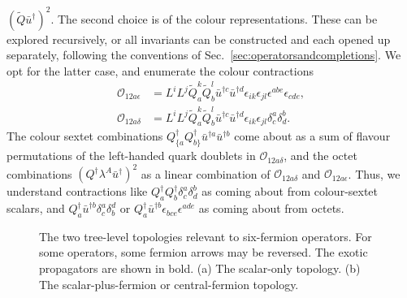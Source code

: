 $(\tilde{Q}\bar{u}^{\dagger})^{2}$. The second choice is of the colour
representations. These can be explored recursively, or all invariants can be
constructed and each opened up separately, following the conventions of
Sec.~\ref{sec:operatorsandcompletions}. We opt for the latter case, and
enumerate the colour contractions
\begin{subequations}
  \begin{align}
    \mathcal{O}_{12a\epsilon} &= L^{i} L^{j} \tilde{Q}^{k}_{a} \tilde{Q}^{l}_{b} \bar{u}^{\dagger c} \bar{u}^{\dagger d} \epsilon_{ik}\epsilon_{jl} \epsilon^{abe}\epsilon_{cde}, \\
    \mathcal{O}_{12a\delta} &= L^{i} L^{j} \tilde{Q}^{k}_{a} \tilde{Q}^{l}_{b} \bar{u}^{\dagger c} \bar{u}^{\dagger d} \epsilon_{ik}\epsilon_{jl} \delta_{c}^{a} \delta_{d}^{b}.
  \end{align}
\end{subequations}
The colour sextet combinations
$Q^{\dagger}_{\{a} Q^{\dagger}_{b\}} \bar{u}^{\dagger a} \bar{u}^{\dagger b}$
come about as a sum of flavour permutations of the left-handed quark doublets in
$\mathcal{O}_{12a\delta}$, and the octet combinations
$(Q^{\dagger} \lambda^{A} \bar{u}^{\dagger})^{2}$ as a linear combination of
$\mathcal{O}_{12a\delta}$ and $\mathcal{O}_{12a\epsilon}$. Thus, we understand
contractions like
$Q^{\dagger}_{a} Q^{\dagger}_{b} \delta^{a}_{c} \delta^{b}_{d}$ as coming about
from colour-sextet scalars, and
$Q^{\dagger}_{a} \bar{u}^{\dagger b} \delta^{a}_{c} \delta^{d}_{b}$ or
$Q^{\dagger}_{a} \bar{u}^{\dagger b} \epsilon_{bce}\epsilon^{ade}$ as coming
about from octets.

\begin{figure}[t]
  \centering
  \caption[The two tree-level topologies relevant to six-fermion operators.]{The
    two tree-level topologies relevant to six-fermion operators. For some
    operators, some fermion arrows may be reversed. The exotic propagators are
    shown in bold. (a) The scalar-only topology. (b) The scalar-plus-fermion or
    central-fermion topology.}
  \label{fig:6f-topologies}
\end{figure}

